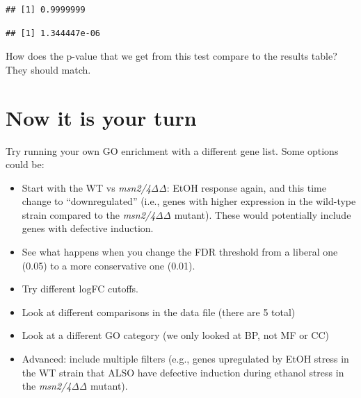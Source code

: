 \documentclass[
]{book}
\newenvironment{Shaded}{\begin{snugshade}}{\end{snugshade}}
\newcommand{\AttributeTok}[1]{\textcolor[rgb]{0.13,0.29,0.53}{#1}}
\newcommand{\CommentTok}[1]{\textcolor[rgb]{0.56,0.35,0.01}{\textit{#1}}}
\newcommand{\DecValTok}[1]{\textcolor[rgb]{0.00,0.00,0.81}{#1}}
\newcommand{\FunctionTok}[1]{\textcolor[rgb]{0.13,0.29,0.53}{\textbf{#1}}}
\newcommand{\NormalTok}[1]{#1}
\newcommand{\SpecialCharTok}[1]{\textcolor[rgb]{0.81,0.36,0.00}{\textbf{#1}}}
\newcommand{\StringTok}[1]{\textcolor[rgb]{0.31,0.60,0.02}{#1}}
\providecommand{\tightlist}{%
  \setlength{\itemsep}{0pt}\setlength{\parskip}{0pt}}
\begin{document}
\begin{verbatim}
## [1] 0.9999999
\end{verbatim}

\begin{Shaded}
\end{Shaded}

\begin{verbatim}
## [1] 1.344447e-06
\end{verbatim}

How does the p-value that we get from this test compare to the results table? They should match.

\hypertarget{now-it-is-your-turn}{%
\section{Now it is your turn}\label{now-it-is-your-turn}}

Try running your own GO enrichment with a different gene list. Some options could be:

\begin{itemize}
\tightlist
\item
  Start with the WT vs \emph{msn2/4ΔΔ}: EtOH response again, and this time change to ``downregulated'' (i.e., genes with higher expression in the wild-type strain compared to the \emph{msn2/4ΔΔ} mutant). These would potentially include genes with defective induction.
\item
  See what happens when you change the FDR threshold from a liberal one (0.05) to a more conservative one (0.01).
\item
  Try different logFC cutoffs.
\item
  Look at different comparisons in the data file (there are 5 total)
\item
  Look at a different GO category (we only looked at BP, not MF or CC)
\item
  Advanced: include multiple filters (e.g., genes upregulated by EtOH stress in the WT strain that ALSO have defective induction during ethanol stress in the \emph{msn2/4ΔΔ} mutant).
\end{itemize}
\end{document}
